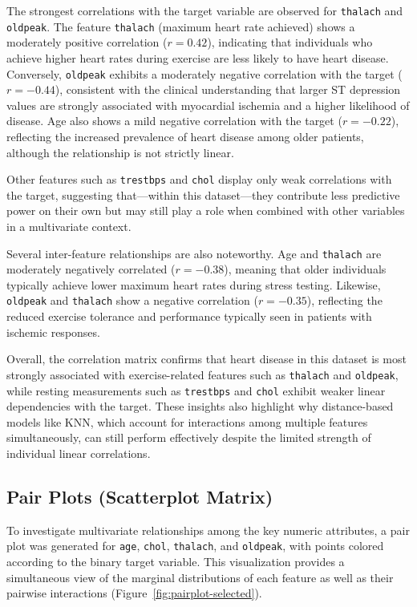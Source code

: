 The strongest correlations with the target variable are observed for \texttt{thalach} and \texttt{oldpeak}.
The feature \texttt{thalach} (maximum heart rate achieved) shows a moderately positive correlation ($r = 0.42$),
indicating that individuals who achieve higher heart rates during exercise are less likely to have heart disease.
Conversely, \texttt{oldpeak} exhibits a moderately negative correlation with the target ($r = -0.44$), consistent
with the clinical understanding that larger ST depression values are strongly associated with myocardial ischemia
and a higher likelihood of disease. Age also shows a mild negative correlation with the target ($r = -0.22$),
reflecting the increased prevalence of heart disease among older patients, although the relationship is not strictly linear.

Other features such as \texttt{trestbps} and \texttt{chol} display only weak correlations with the target,
suggesting that—within this dataset—they contribute less predictive power on their own but may still play a role
when combined with other variables in a multivariate context.

Several inter-feature relationships are also noteworthy. Age and \texttt{thalach} are moderately negatively correlated
($r = -0.38$), meaning that older individuals typically achieve lower maximum heart rates during stress testing.
Likewise, \texttt{oldpeak} and \texttt{thalach} show a negative correlation ($r = -0.35$), reflecting the reduced
exercise tolerance and performance typically seen in patients with ischemic responses.

Overall, the correlation matrix confirms that heart disease in this dataset is most strongly associated with
exercise-related features such as \texttt{thalach} and \texttt{oldpeak}, while resting measurements such as
\texttt{trestbps} and \texttt{chol} exhibit weaker linear dependencies with the target. These insights also highlight
why distance-based models like KNN, which account for interactions among multiple features simultaneously,
can still perform effectively despite the limited strength of individual linear correlations.

\subsection{Pair Plots (Scatterplot Matrix)}

To investigate multivariate relationships among the key numeric attributes, a pair plot was generated for
\texttt{age}, \texttt{chol}, \texttt{thalach}, and \texttt{oldpeak}, with points colored according to the
binary target variable. This visualization provides a simultaneous view of the marginal distributions of
each feature as well as their pairwise interactions (Figure~\ref{fig:pairplot-selected}).

